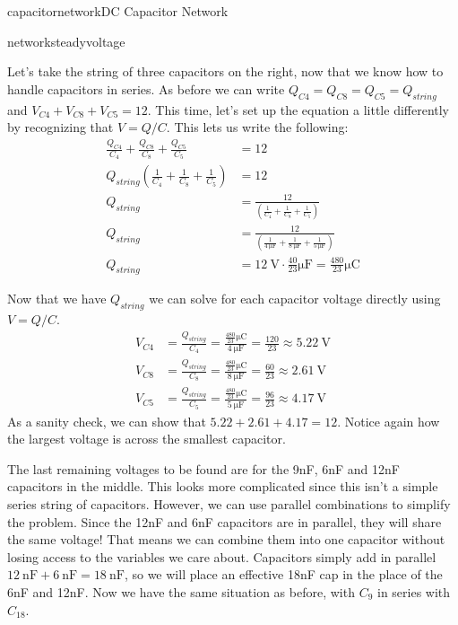\begin{mainquestion}{capacitornetwork}{DC Capacitor Network}
\begin{partquestion}{networksteadyvoltage}
\begin{answer}
Let's take the string of three capacitors on the right, now that we know how to handle capacitors in series. As before we can write $Q_{C4} = Q_{C8} = Q_{C5} = Q_{string}$ and $V_{C4} + V_{C8} + V_{C5} = 12$. This time, let's set up the equation a little differently by recognizing that $V = Q/C$. This lets us write the following:
\begin{align*}
\frac{Q_{C4}}{C_4} + \frac{Q_{C8}}{C_8} + \frac{Q_{C5}}{C_5} &= 12 \\
Q_{string}(\frac{1}{C_4} + \frac{1}{C_8} + \frac{1}{C_5}) &= 12 \\
Q_{string} &= \frac{12}{(\frac{1}{C_4} + \frac{1}{C_8} + \frac{1}{C_5})} \\
Q_{string} &= \frac{12}{(\frac{1}{\qty{4}{\micro\farad}} + \frac{1}{\qty{8}{\micro\farad}} + \frac{1}{\qty{5}{\micro\farad}})} \\
Q_{string} &= \qty{12}{\volt} \cdot \frac{40}{23}\unit{\micro\farad} = \frac{480}{23}\unit{\micro\coulomb}
\end{align*}

Now that we have $Q_{string}$ we can solve for each capacitor voltage directly using $V = Q/C$.
\begin{align*}
    V_{C4} &= \frac{Q_{string}}{C_4} = \frac{\frac{480}{23}\unit{\micro\coulomb}}{\qty{4}{\micro\farad}} = \frac{120}{23} \approx \qty{5.22}{\volt} \\
    V_{C8} &= \frac{Q_{string}}{C_8} = \frac{\frac{480}{23}\unit{\micro\coulomb}}{\qty{8}{\micro\farad}} = \frac{60}{23} \approx \qty{2.61}{\volt} \\
    V_{C5} &= \frac{Q_{string}}{C_5} = \frac{\frac{480}{23}\unit{\micro\coulomb}}{\qty{5}{\micro\farad}} = \frac{96}{23} \approx \qty{4.17}{\volt}
\end{align*}
As a sanity check, we can show that $5.22 + 2.61 + 4.17 = 12$. Notice again how the largest voltage is across the smallest capacitor.

The last remaining voltages to be found are for the 9nF, 6nF and 12nF capacitors in the middle. This looks more complicated since this isn't a simple series string of capacitors. However, we can use parallel combinations to simplify the problem. Since the 12nF and 6nF capacitors are in parallel, they will share the same voltage! That means we can combine them into one capacitor without losing access to the variables we care about. Capacitors simply add in parallel $\qty{12}{\nano\farad} + \qty{6}{\nano\farad} = \qty{18}{\nano\farad}$, so we will place an effective 18nF cap in the place of the 6nF and 12nF. Now we have the same situation as before, with $C_9$ in series with $C_{18}$.


\end{answer}
\end{partquestion}
\end{mainquestion}
